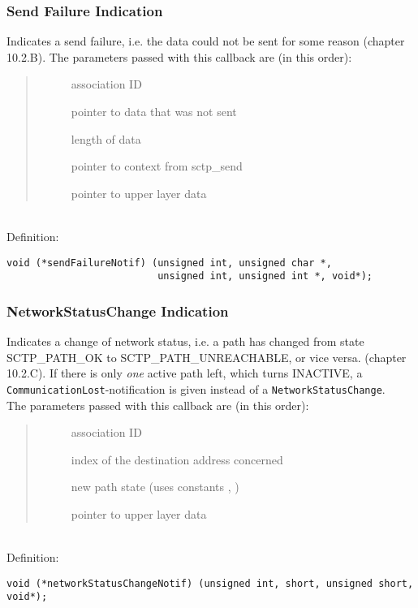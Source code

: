\documentclass[10pt]{article}
\newcommand{\bv}{\vspace{0,1cm}\noindent \\ Definition:\footnotesize\begin{verbatim}}
\newcommand{\n}{\normalsize}
\newcommand{\no}{ }
\begin{document}
\subsubsection{Send Failure Indication}
Indicates a send failure, i.e. the data could not be sent
for some reason (chapter 10.2.B).
The parameters passed with this callback are (in this order):
\begin{quote} \begin{description} \no
 \item[] association ID
 \item[] pointer to data that was not sent
 \item[] length of data
 \item[] pointer to context from sctp_send
 \item[] pointer to upper layer data
\end{description} \end{quote}
\bv
void (*sendFailureNotif) (unsigned int, unsigned char *,
                          unsigned int, unsigned int *, void*);
\end{verbatim}\n

\subsubsection{NetworkStatusChange Indication}
Indicates a change of network status, i.e. a path has changed from state
SCTP_PATH_OK to SCTP_PATH_UNREACHABLE, or vice versa. (chapter 10.2.C).
If there is only \emph{one} active path left, which turns INACTIVE, a
\texttt{CommunicationLost}-notification is given instead of a
\texttt{NetworkStatusChange}.\\
The parameters passed with this callback are (in this order):
\begin{quote} \begin{description} \no
 \item[] association ID
 \item[] index of  the destination address concerned
 \item[] new path state (uses constants
,  )
 \item[] pointer to upper layer data
\end{description} \end{quote}
\bv
void (*networkStatusChangeNotif) (unsigned int, short, unsigned short, void*);
\end{verbatim}\n
\end{document}
